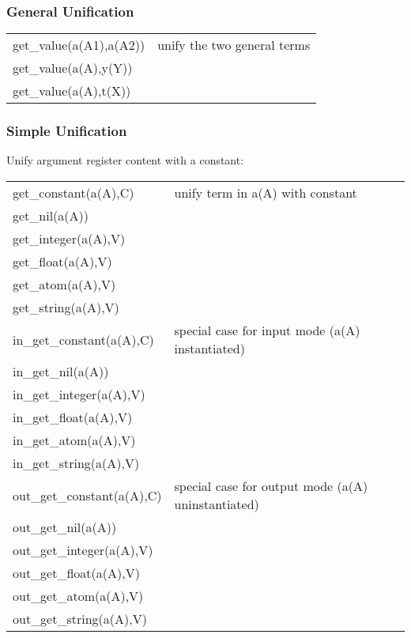 \subsubsection{General Unification}

\begin{tabular}{|l|l|}
\hline
get_value(a(A1),a(A2))          & unify the two general terms             \\
get_value(a(A),y(Y))            &                 \\
get_value(a(A),t(X))            &                 \\
\hline
\end{tabular}

\subsubsection{Simple Unification}
Unify argument register content with a constant:

\begin{tabular}{|l|l|}
\hline
get_constant(a(A),C)    & unify term in a(A) with constant                        \\
get_nil(a(A))           &                         \\
get_integer(a(A),V)     &                         \\
get_float(a(A),V)       &                         \\
get_atom(a(A),V)        &                         \\
get_string(a(A),V)      &                         \\
\hline
in_get_constant(a(A),C) & special case for input mode (a(A) instantiated)                         \\
in_get_nil(a(A))        &                         \\
in_get_integer(a(A),V)  &                         \\
in_get_float(a(A),V)    &                         \\
in_get_atom(a(A),V)     &                         \\
in_get_string(a(A),V)   &                         \\
\hline
out_get_constant(a(A),C)& special case for output mode (a(A) uninstantiated)                      \\
out_get_nil(a(A))       &                         \\
out_get_integer(a(A),V) &                         \\
out_get_float(a(A),V)   &                         \\
out_get_atom(a(A),V)    &                         \\
out_get_string(a(A),V)  &                         \\
\hline
\end{tabular}

